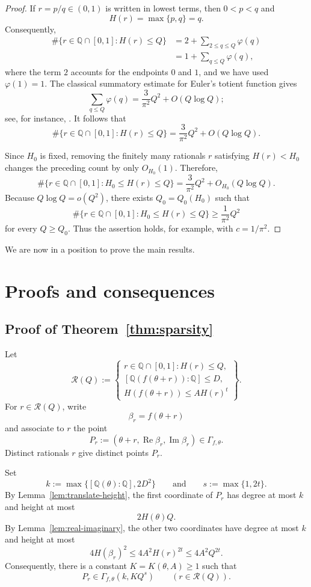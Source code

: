 \documentclass[11pt]{amsart}
\theoremstyle{remark}
\newcommand{\Q}{\mathbb{Q}}
\DeclareMathOperator{\RePart}{Re}
\DeclareMathOperator{\ImPart}{Im}
\begin{document}
\begin{proof}
If $r=p/q\in(0,1)$ is written in lowest terms, then $0<p<q$ and
\[
H(r)=\max\{p,q\}=q.
\]
Consequently,
\[
\begin{aligned}
\#\{r\in\Q\cap[0,1]:H(r)\leq Q\}
&=
2+\sum_{2\leq q\leq Q}\varphi(q)\\
&=
1+\sum_{q\leq Q}\varphi(q),
\end{aligned}
\]
where the term $2$ accounts for the endpoints $0$ and $1$, and we have
used $\varphi(1)=1$. The classical summatory estimate for Euler's
totient function gives
\[
\sum_{q\leq Q}\varphi(q)
=
\frac{3}{\pi^2}Q^2+O(Q\log Q);
\]
see, for instance, \cite[Theorem~3.7]{Apostol1976}. It follows that
\[
\#\{r\in\Q\cap[0,1]:H(r)\leq Q\}
=
\frac{3}{\pi^2}Q^2+O(Q\log Q).
\]

Since $H_0$ is fixed, removing the finitely many rationals $r$ satisfying
$H(r)<H_0$ changes the preceding count by only $O_{H_0}(1)$. Therefore,
\[
\#\{r\in\Q\cap[0,1]:H_0\leq H(r)\leq Q\}
=
\frac{3}{\pi^2}Q^2+O_{H_0}(Q\log Q).
\]
Because $Q\log Q=o(Q^2)$, there exists $Q_0=Q_0(H_0)$ such that
\[
\#\{r\in\Q\cap[0,1]:H_0\leq H(r)\leq Q\}
\geq \frac{1}{\pi^2}Q^2
\]
for every $Q\geq Q_0$. Thus the assertion holds, for example, with
$c=1/\pi^2$.
\end{proof}

We are now in a position to prove the main results.

\section{Proofs and consequences}\label{S3}

\subsection{Proof of Theorem~\ref{thm:sparsity}}

Let
\[
\mathcal R(Q)
:=
\left\{
\begin{array}{c}
r\in\Q\cap[0,1]:H(r)\leq Q,\\[1mm]
[\Q(f(\theta+r)):\Q]\leq D,\\[1mm]
H(f(\theta+r))\leq A H(r)^t
\end{array}
\right\}.
\]
For $r\in\mathcal R(Q)$, write
\[
\beta_r=f(\theta+r)
\]
and associate to $r$ the point
\[
P_r
:=
(\theta+r,\RePart\beta_r,\ImPart\beta_r)
\in\Gamma_{f,\theta}.
\]
Distinct rationals $r$ give distinct points $P_r$.

Set
\[
k:=\max\{[\Q(\theta):\Q],2D^2\}
\qquad\text{and}\qquad
s:=\max\{1,2t\}.
\]
By Lemma~\ref{lem:translate-height}, the first coordinate of $P_r$ has degree at most $k$ and height at most
\[
2H(\theta)Q.
\]
By Lemma~\ref{lem:real-imaginary}, the other two coordinates have degree at most $k$ and height at most
\[
4H(\beta_r)^2
\leq4A^2H(r)^{2t}
\leq4A^2Q^{2t}.
\]
Consequently, there is a constant $K=K(\theta,A)\geq1$ such that
\[
P_r\in\Gamma_{f,\theta}(k,KQ^s)
\qquad(r\in\mathcal R(Q)).
\]
\end{document}
